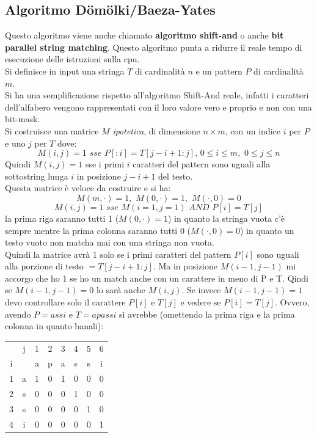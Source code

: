 \documentclass[a4paper,12pt, oneside]{book}
\begin{document}
\subsection{Algoritmo D\"om\"olki/Baeza-Yates}
Questo algoritmo viene anche chiamato \textbf{algoritmo shift-and} o
anche \textbf{bit parallel string matching}. Questo algoritmo punta a
ridurre il reale tempo di esecuzione delle istruzioni sulla cpu.\\
Si definisce in input una stringa $T$ di cardinalità $n$ e un pattern
$P$ di cardinalità $m$.\\
Si ha una semplificazione rispetto all'algoritmo Shift-And reale,
infatti i caratteri dell'alfabero vengono rappresentati con il loro
valore vero e proprio e non con una bit-mask.\\
Si costruisce una matrice $M$ \textit{ipotetica}, di dimensione
$n\times m$, con un indice $i$ per $P$ e uno $j$ per $T$  dove:
\[M(i,j)=1\,\,sse\,\,P[:i]=T[j-i+1:j],\,0\leq i\leq m,\,\,0\leq j\leq
  n\]
Quindi $M(i,j)=1$ sse i primi $i$ caratteri del pattern sono uguali
alla sottostring lunga $i$ in posizione $j-i+1$ del testo.\\
Questa matrice è veloce da costruire e si ha:
\[M(m,\cdot) = 1,\,\, M(0,\cdot)=1,\,\, M(\cdot, 0)=0\]
\[M(i,j)=1\,\,sse\,\,M(i=1, j=1)\,\,AND\,\, P[i]=T[j]\]
la prima riga saranno tutti 1 ($ M(0,\cdot)=1$) in quanto la stringa
vuota c'è sempre mentre la prima colonna saranno tutti 0 ($M(\cdot,
0)=0$) in quanto un testo vuoto non matcha mai con una stringa non
vuota.\\
Quindi la matrice avrà 1 solo se i primi caratteri del pattern $P[i]$ sono
uguali alla porzione di testo $=T[j-i+1:j]$. Ma in posizione $M(i-1,
j-1)$ mi accorgo che ho 1 se ho un match anche con un carattere in
meno di P e T. Qindi se $M(i-1,j-1)=0$ lo sarà anche $M(i,j)$. Se
invece $M(i-1,j-1)=1$ devo controllare solo il carattere $P[i]$ e
$T[j]$ e vedere se $ P[i]=T[j]$.
Ovvero, avendo $P=assi$ e $T=apassi$ si avrebbe (omettendo la prima
riga e la prima colonna in quanto banali):
\begin{center}
  \begin{tabular}{c c | c c c c c c}
    & j & 1 & 2 & 3 & 4 & 5 & 6 \\
    i & & a & p & a & s & s & i \\
    \hline
    1 & a & 1 & 0 & 1 & 0 & 0 & 0\\
    2 & s & 0 & 0 & 0 & 1 & 0 & 0 \\
    3 & s & 0 & 0 & 0 & 0 & 1 & 0 \\
    4 & i & 0 & 0 & 0 & 0 & 0 & 1
  \end{tabular}
\end{center}
\end{document}
